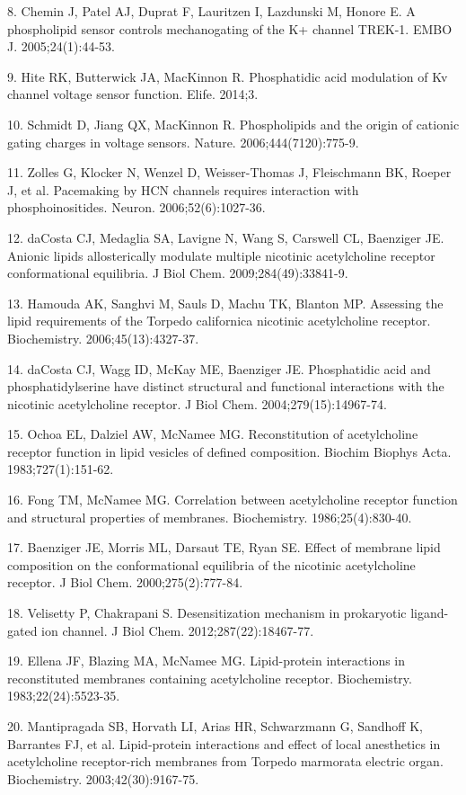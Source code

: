 8. Chemin J, Patel AJ, Duprat F, Lauritzen I, Lazdunski M, Honore E. A
phospholipid sensor controls mechanogating of the K+ channel TREK-1.
EMBO J. 2005;24(1):44-53.

9. Hite RK, Butterwick JA, MacKinnon R. Phosphatidic acid modulation of
Kv channel voltage sensor function. Elife. 2014;3.

10. Schmidt D, Jiang QX, MacKinnon R. Phospholipids and the origin of
cationic gating charges in voltage sensors. Nature.
2006;444(7120):775-9.

11. Zolles G, Klocker N, Wenzel D, Weisser-Thomas J, Fleischmann BK,
Roeper J, et al. Pacemaking by HCN channels requires interaction with
phosphoinositides. Neuron. 2006;52(6):1027-36.

12. daCosta CJ, Medaglia SA, Lavigne N, Wang S, Carswell CL, Baenziger
JE. Anionic lipids allosterically modulate multiple nicotinic
acetylcholine receptor conformational equilibria. J Biol Chem.
2009;284(49):33841-9.

13. Hamouda AK, Sanghvi M, Sauls D, Machu TK, Blanton MP. Assessing the
lipid requirements of the Torpedo californica nicotinic acetylcholine
receptor. Biochemistry. 2006;45(13):4327-37.

14. daCosta CJ, Wagg ID, McKay ME, Baenziger JE. Phosphatidic acid and
phosphatidylserine have distinct structural and functional interactions
with the nicotinic acetylcholine receptor. J Biol Chem.
2004;279(15):14967-74.

15. Ochoa EL, Dalziel AW, McNamee MG. Reconstitution of acetylcholine
receptor function in lipid vesicles of defined composition. Biochim
Biophys Acta. 1983;727(1):151-62.

16. Fong TM, McNamee MG. Correlation between acetylcholine receptor
function and structural properties of membranes. Biochemistry.
1986;25(4):830-40.

17. Baenziger JE, Morris ML, Darsaut TE, Ryan SE. Effect of membrane
lipid composition on the conformational equilibria of the nicotinic
acetylcholine receptor. J Biol Chem. 2000;275(2):777-84.

18. Velisetty P, Chakrapani S. Desensitization mechanism in prokaryotic
ligand-gated ion channel. J Biol Chem. 2012;287(22):18467-77.

19. Ellena JF, Blazing MA, McNamee MG. Lipid-protein interactions in
reconstituted membranes containing acetylcholine receptor. Biochemistry.
1983;22(24):5523-35.

20. Mantipragada SB, Horvath LI, Arias HR, Schwarzmann G, Sandhoff K,
Barrantes FJ, et al. Lipid-protein interactions and effect of local
anesthetics in acetylcholine receptor-rich membranes from Torpedo
marmorata electric organ. Biochemistry. 2003;42(30):9167-75.

